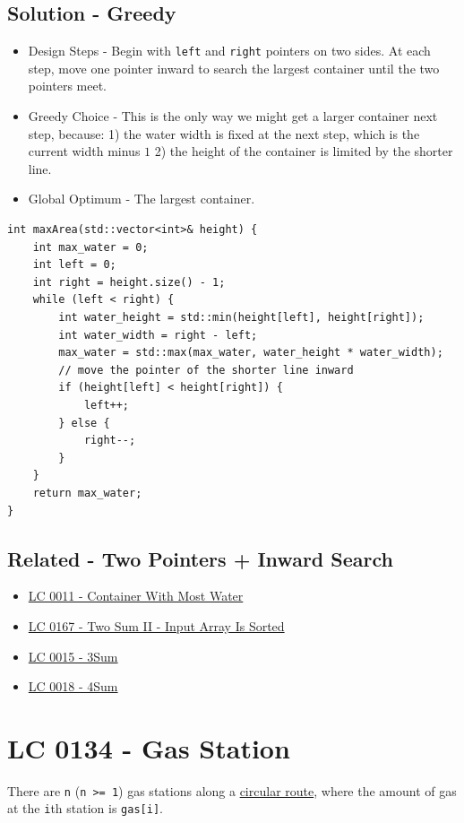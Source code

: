 \subsection*{Solution - Greedy}
\begin{itemize}
	\item Design Steps - Begin with {\colorbox{CodeBackground}{\lstinline|left|}} and {\colorbox{CodeBackground}{\lstinline|right|}} pointers on two sides. At each step, move one pointer inward to search the largest container until the two pointers meet.
	\item Greedy Choice - {\color{magenta}{At each step, move the pointer of the shorter line inward.}} This is the only way we might get a larger container next step, because: 1) the water width is fixed at the next step, which is the current width minus $1$ 2) the height of the container is limited by the shorter line.
	\item Global Optimum - The largest container.
\end{itemize}
\begin{lstlisting}
int maxArea(std::vector<int>& height) {
	int max_water = 0;
	int left = 0;
	int right = height.size() - 1;
	while (left < right) {
		int water_height = std::min(height[left], height[right]);
		int water_width = right - left;
		max_water = std::max(max_water, water_height * water_width);
		// move the pointer of the shorter line inward
		if (height[left] < height[right]) {
			left++;
		} else {
			right--;
		}
	}
	return max_water;
}
\end{lstlisting}

\subsection*{Related - Two Pointers + Inward Search}
\begin{itemize}
\item \hyperref[lc0011]{LC 0011 - Container With Most Water}
\item \hyperref[lc0167]{LC 0167 - Two Sum II - Input Array Is Sorted}
\item \hyperref[lc0015]{LC 0015 - 3Sum}
\item \hyperref[lc0018]{LC 0018 - 4Sum}
\end{itemize}

\section{LC 0134 - Gas Station}
There are {\colorbox{CodeBackground}{\lstinline|n|}} ({\colorbox{CodeBackground}{\lstinline|n >= 1|}}) gas stations along a \ul{circular route}, where the amount of gas at the {\colorbox{CodeBackground}{\lstinline|i|}}th station is {\colorbox{CodeBackground}{\lstinline|gas[i]|}}.\\

